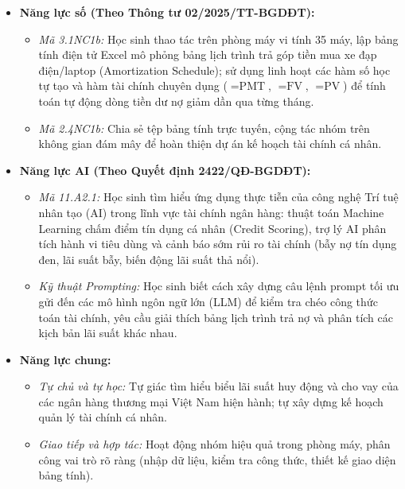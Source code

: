 \documentclass[12pt, a4paper]{article}
\begin{document}
\begin{itemize}[leftmargin=1.2cm]
    \item \textbf{Năng lực số (Theo Thông tư 02/2025/TT-BGDĐT):}
    \begin{itemize}[leftmargin=0.6cm]
        \item \textit{Mã 3.1NC1b:} Học sinh thao tác trên phòng máy vi tính 35 máy, lập bảng tính điện tử Excel mô phỏng bảng lịch trình trả góp tiền mua xe đạp điện/laptop (Amortization Schedule); sử dụng linh hoạt các hàm số học tự tạo và hàm tài chính chuyên dụng ($=\text{PMT}$, $=\text{FV}$, $=\text{PV}$) để tính toán tự động dòng tiền dư nợ giảm dần qua từng tháng.
        \item \textit{Mã 2.4NC1b:} Chia sẻ tệp bảng tính trực tuyến, cộng tác nhóm trên không gian đám mây để hoàn thiện dự án kế hoạch tài chính cá nhân.
    \end{itemize}

    \item \textbf{Năng lực AI (Theo Quyết định 2422/QĐ-BGDĐT):}
    \begin{itemize}[leftmargin=0.6cm]
        \item \textit{Mã 11.A2.1:} Học sinh tìm hiểu ứng dụng thực tiễn của công nghệ Trí tuệ nhân tạo (AI) trong lĩnh vực tài chính ngân hàng: thuật toán Machine Learning chấm điểm tín dụng cá nhân (Credit Scoring), trợ lý AI phân tích hành vi tiêu dùng và cảnh báo sớm rủi ro tài chính (bẫy nợ tín dụng đen, lãi suất bẫy, biến động lãi suất thả nổi).
        \item \textit{Kỹ thuật Prompting:} Học sinh biết cách xây dựng câu lệnh prompt tối ưu gửi đến các mô hình ngôn ngữ lớn (LLM) để kiểm tra chéo công thức toán tài chính, yêu cầu giải thích bảng lịch trình trả nợ và phân tích các kịch bản lãi suất khác nhau.
    \end{itemize}

    \item \textbf{Năng lực chung:}
    \begin{itemize}[leftmargin=0.6cm]
        \item \textit{Tự chủ và tự học:} Tự giác tìm hiểu biểu lãi suất huy động và cho vay của các ngân hàng thương mại Việt Nam hiện hành; tự xây dựng kế hoạch quản lý tài chính cá nhân.
        \item \textit{Giao tiếp và hợp tác:} Hoạt động nhóm hiệu quả trong phòng máy, phân công vai trò rõ ràng (nhập dữ liệu, kiểm tra công thức, thiết kế giao diện bảng tính).
    \end{itemize}
\end{itemize}
\end{document}
